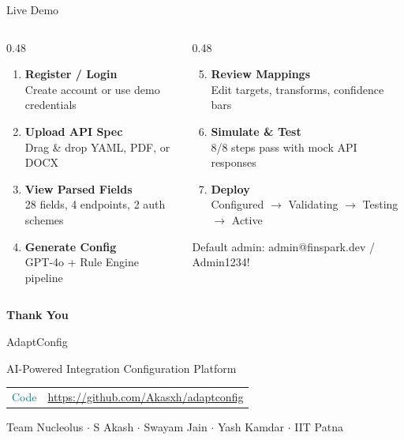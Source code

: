\documentclass[aspectratio=169,11pt]{beamer}
\begin{document}
\begin{frame}{Live Demo}
\vspace{0.5em}
\begin{columns}[T]
\begin{column}{0.48\textwidth}
\begin{enumerate}
\item \textbf{Register / Login}\\{\small Create account or use demo credentials}
\item \textbf{Upload API Spec}\\{\small Drag \& drop YAML, PDF, or DOCX}
\item \textbf{View Parsed Fields}\\{\small 28 fields, 4 endpoints, 2 auth schemes}
\item \textbf{Generate Config}\\{\small GPT-4o + Rule Engine pipeline}
\end{enumerate}
\end{column}
\begin{column}{0.48\textwidth}
\begin{enumerate}
\setcounter{enumi}{4}
\item \textbf{Review Mappings}\\{\small Edit targets, transforms, confidence bars}
\item \textbf{Simulate \& Test}\\{\small 8/8 steps pass with mock API responses}
\item \textbf{Deploy}\\{\small Configured $\to$ Validating $\to$ Testing $\to$ Active}
\end{enumerate}
\vspace{0.5em}
{\small\color{ts} Default admin: admin@finspark.dev / Admin1234!}
\end{column}
\end{columns}
\end{frame}

\begin{frame}[plain]
\begin{center}
\vspace{1.5cm}
{\Huge\bfseries Thank You}

\vspace{0.6em}
{\Large\color{teal} AdaptConfig}

\vspace{0.2em}
{\color{ts} AI-Powered Integration Configuration Platform}

\vspace{1.2em}

{\small
\begin{tabular}{rl}
\textcolor{teal}{Code} & \url{https://github.com/Akasxh/adaptconfig} \\
\end{tabular}
}

\vspace{0.8em}
{\small\color{ts} Team Nucleolus $\cdot$ S Akash $\cdot$ Swayam Jain $\cdot$ Yash Kamdar $\cdot$ IIT Patna}
\end{center}
\end{frame}
\end{document}
